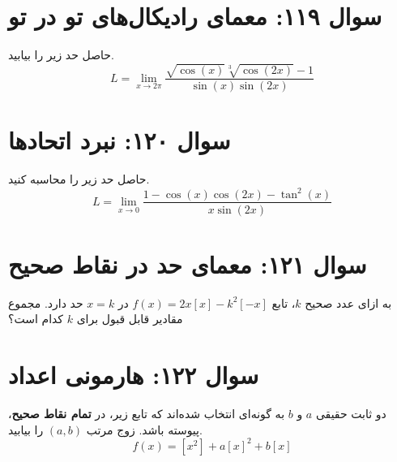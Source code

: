 \documentclass[12pt]{article}
\begin{document}
\section*{سوال ۱۱۹: معمای رادیکال‌های تو در تو}
حاصل حد زیر را بیابید.
\begin{displaymath}
	L = \lim_{x \to 2\pi} \frac{\sqrt{\cos(x)}\sqrt[3]{\cos(2x)} - 1}{\sin(x)\sin(2x)}
\end{displaymath}



\vspace{1cm}
\hrulefill
\vspace{1cm}

\section*{سوال ۱۲۰: نبرد اتحادها}
حاصل حد زیر را محاسبه کنید.
\begin{displaymath}
	L = \lim_{x \to 0} \frac{1 - \cos(x)\cos(2x) - \tan^2(x)}{x \sin(2x)}
\end{displaymath}



\vspace{1cm}
\hrulefill
\vspace{1cm}

\section*{سوال ۱۲۱: معمای حد در نقاط صحیح}
به ازای عدد صحیح \(k\)، تابع \( f(x)=2x[x] - k^2[-x] \) در \(x=k\) حد دارد. مجموع مقادیر قابل قبول برای \(k\) کدام است؟



\vspace{1cm}
\hrulefill
\vspace{1cm}

\section*{سوال ۱۲۲: هارمونی اعداد}
دو ثابت حقیقی \(a\) و \(b\) به گونه‌ای انتخاب شده‌اند که تابع زیر، در \textbf{تمام نقاط صحیح}، پیوسته باشد. زوج مرتب \( (a,b) \) را بیابید.
\begin{displaymath}
	f(x) = [x^2] + a[x]^2 + b[x]
\end{displaymath}
\end{document}
